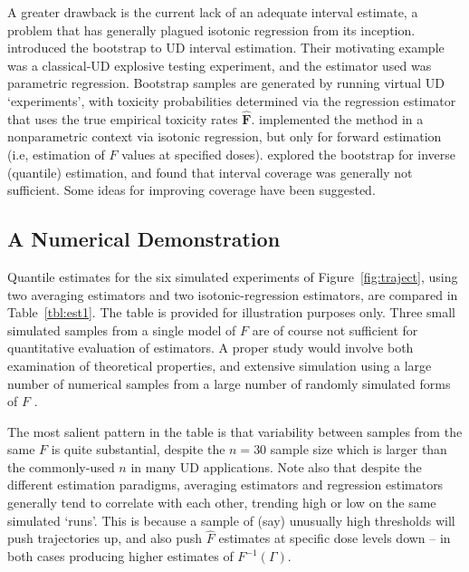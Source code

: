 A greater drawback is the current lack of an adequate interval estimate, a problem that has generally plagued isotonic regression from its inception. \cite{Chao:Fuh:boot:2001} introduced the bootstrap to UD interval estimation. Their motivating example was a classical-UD explosive testing experiment, and the estimator used was parametric regression. Bootstrap samples are generated by running virtual UD `experiments', with toxicity probabilities determined via the regression estimator that uses the true empirical toxicity rates $\mathbf{\hat{F}}$.  \cite{Styl:Pros:Flou:esti:2003} implemented the method in a nonparametric context via isotonic regression, but only for forward estimation (i.e, estimation of $F$ values at specified doses). \cite[Section~3.3]{Oron07} explored the bootstrap for inverse (quantile) estimation, and found that interval coverage was generally not sufficient. Some ideas for improving coverage have been suggested.

\subsection{A Numerical Demonstration}

Quantile estimates for the six simulated experiments of Figure~\ref{fig:traject}, using two averaging estimators and two isotonic-regression estimators, are compared in Table~\ref{tbl:est1}.  The table is provided for illustration purposes only. Three small simulated samples from a single model of $F$ are of course not sufficient for quantitative evaluation of estimators. A proper study would involve both examination of theoretical properties, and extensive simulation using a large number of numerical samples from a large number of randomly simulated forms of $F$ \citep[online supplement]{Oron:Hoff:smal:2013}.

The most salient pattern in the table is that variability between samples from the same $F$ is quite substantial, despite the $n=30$ sample size which is larger than the commonly-used $n$ in many UD applications. Note also that despite the different estimation paradigms, averaging estimators and regression estimators generally tend to correlate with each other, trending high or low on the same simulated `runs'. This is because a sample of (say) unusually high thresholds will push trajectories up, and also push $\hat{F}$ estimates at specific dose levels down -- in both cases producing higher estimates of  $F^{-1}(\Gamma)$.

